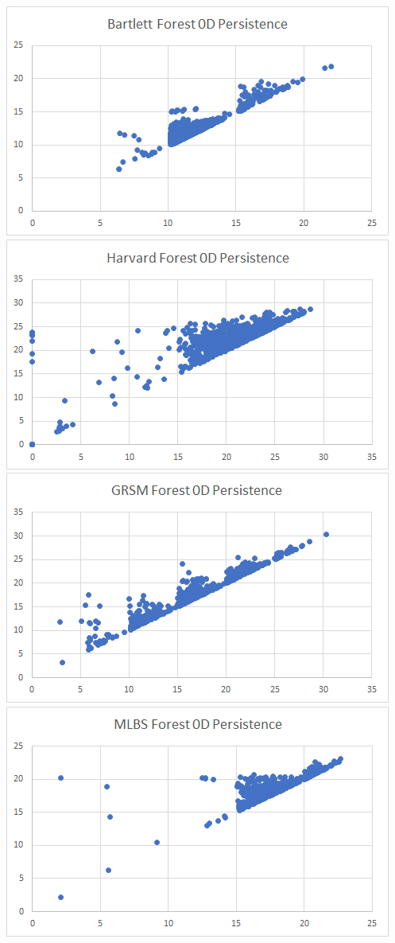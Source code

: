 \documentclass[10pt]{article}
\begin{document}
\noindent \includegraphics[scale= 0.5]{bartlett_0d_persistence}
\includegraphics[scale= 0.5]{harvard_0d_persistence}
\includegraphics[scale= 0.5]{grsm_0d_persistence}
\includegraphics[scale= 0.5]{mlbs_0d_persistence}\\
\end{document}
